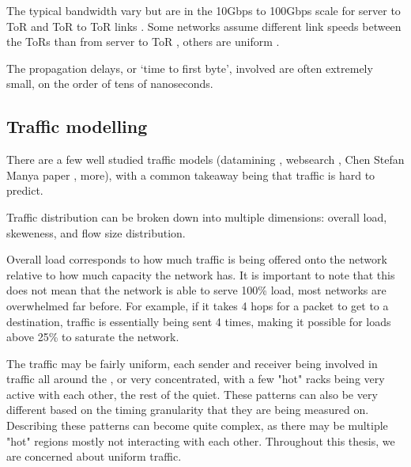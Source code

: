 The typical bandwidth vary but are in the 10Gbps to 100Gbps scale for server to ToR and ToR to ToR links .
Some networks assume different link speeds between the ToRs than from server to ToR , others are uniform .

The propagation delays, or `time to first byte', involved are often extremely small, on the order of tens of nanoseconds. 


\subsection{Traffic modelling} \label{model-traffic}

There are a few well studied \datacenter traffic models (datamining , websearch , Chen Stefan Manya paper , more), with a common takeaway being that \datacenter traffic is hard to predict.

Traffic distribution can be broken down into multiple dimensions: overall load, skeweness, and flow size distribution.


Overall load corresponds to how much traffic is being offered onto the network relative to how much capacity the network has.
It is important to note that this does not mean that the network is able to serve 100\% load, most networks are overwhelmed far before.
For example, if it takes 4 hops for a packet to get to a destination, traffic is essentially being sent 4 times, making it possible for loads above 25\% to saturate the network.  

The traffic may be fairly uniform, each sender and receiver being involved in traffic all around the \datacenter, or very concentrated, with a few "hot" racks being very active with each other, the rest of the \datacenter quiet.  
These patterns can also be very different based on the timing granularity that they are being measured on. %
Describing these patterns can become quite complex, as there may be multiple "hot" regions mostly not interacting with each other.
Throughout this thesis,
we are concerned about uniform traffic. 

